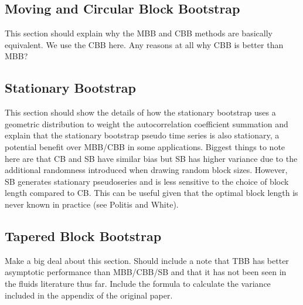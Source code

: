 \documentclass[onecolumn,12pt]{iopart}
\begin{document}
\subsection{Moving and Circular Block Bootstrap}
This section should explain why the MBB and CBB methods are basically equivalent. We use the CBB here. Any reasons at all why CBB is better than MBB?

\subsection{Stationary Bootstrap}
This section should show the details of how the stationary bootstrap uses a geometric distribution to weight the autocorrelation coefficient summation and explain that the stationary bootstrap pseudo time series is also stationary, a potential benefit over MBB/CBB in some applications. Biggest things to note here are that CB and SB have similar bias but SB has higher variance due to the additional randomness introduced when drawing random block sizes. However, SB generates stationary pseudoseries and is less sensitive to the choice of block length compared to CB. This can be useful given that the optimal block length is never known in practice (see Politis and White).

\subsection{Tapered Block Bootstrap}
Make a big deal about this section. Should include a note that TBB has better asymptotic performance than MBB/CBB/SB and that it has not been seen in the fluids literature thus far. Include the formula to calculate the variance included in the appendix of the original paper.
\end{document}
